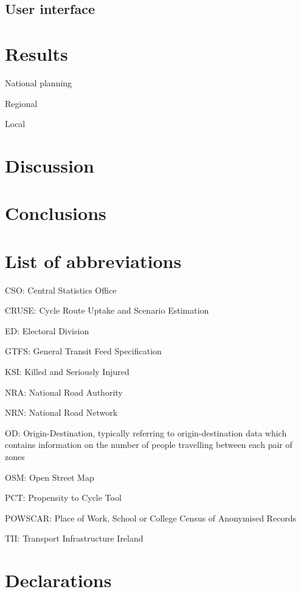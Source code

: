 \documentclass[
  super,
  preprint,
  3p]{elsarticle}
\begin{document}
\hypertarget{sec-ui}{%
\subsection{User interface}\label{sec-ui}}

\hypertarget{sec-results}{%
\section{Results}\label{sec-results}}

National planning

Regional

Local

\hypertarget{sec-discussion}{%
\section{Discussion}\label{sec-discussion}}

\hypertarget{sec-conclusions}{%
\section{Conclusions}\label{sec-conclusions}}

\hypertarget{list-of-abbreviations}{%
\section{List of abbreviations}\label{list-of-abbreviations}}

CSO: Central Statistics Office

CRUSE: Cycle Route Uptake and Scenario Estimation

ED: Electoral Division

GTFS: General Transit Feed Specification

KSI: Killed and Seriously Injured

NRA: National Road Authority

NRN: National Road Network

OD: Origin-Destination, typically referring to origin-destination data
which contains information on the number of people travelling between
each pair of zones

OSM: Open Street Map

PCT: Propensity to Cycle Tool

POWSCAR: Place of Work, School or College Census of Anonymised Records

TII: Transport Infrastructure Ireland

\hypertarget{declarations}{%
\section{Declarations}\label{declarations}}
\end{document}
